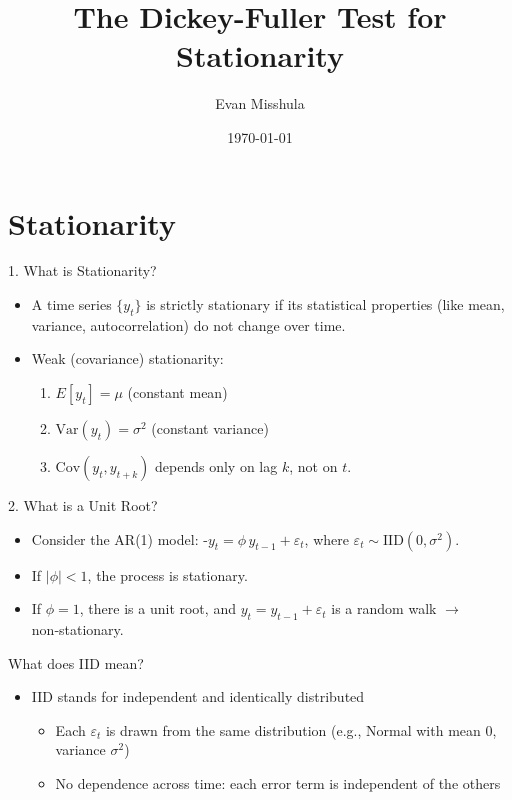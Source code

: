 \documentclass[aspectratio=169]{beamer}
\author{Evan Misshula}
\date{\today}
\title{The Dickey-Fuller Test for Stationarity}
\begin{document}
\maketitle

\section{Stationarity}
\label{sec:orga32723b}
\begin{frame}[label={sec:org95b1c6e}]{1. What is Stationarity?}
\begin{itemize}
\item A time series \(\{y_t\}\) is \alert{\alert{strictly stationary}} if its statistical properties (like mean, variance, autocorrelation) do not change over time.
\item \alert{\alert{Weak (covariance) stationarity}}:  
\begin{enumerate}
\item \(E[y_t] = \mu\) (constant mean)
\item \(\mathrm{Var}(y_t) = \sigma^2\) (constant variance)
\item \(\mathrm{Cov}(y_t, y_{t+k})\) depends only on lag \(k\), not on \(t\).
\end{enumerate}
\end{itemize}
\end{frame}

\begin{frame}[label={sec:orgf501679}]{2. What is a Unit Root?}
\begin{itemize}
\item Consider the AR(1) model: -\(y_t = \phi\,y_{t-1} + \varepsilon_t\), where \(\varepsilon_t \sim \mathrm{IID}(0, \sigma^2)\).
\item If \(|\phi| < 1\), the process is stationary.
\item If \(\phi = 1\), there is a \alert{unit root}, and \(y_t =
    y_{t-1} + \varepsilon_t\) is a \alert{random walk} \(\rightarrow\) non‑stationary.
\end{itemize}
\end{frame}

\begin{frame}[label={sec:org556f11d}]{What does IID mean?}
\begin{itemize}
\item \alert{IID} stands for \alert{independent and identically distributed}
\begin{itemize}
\item Each \(\varepsilon_t\) is drawn from the same distribution
(e.g., Normal with mean 0, variance \(\sigma^2\))
\item No dependence across time: each error term is independent of the
others
\end{itemize}
\end{itemize}
\end{frame}
\end{document}
